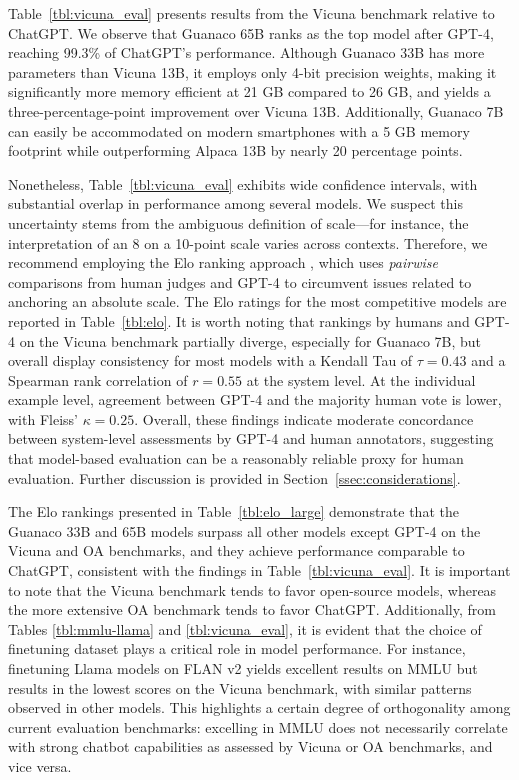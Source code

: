 Table~\ref{tbl:vicuna_eval} presents results from the Vicuna benchmark \cite{vicuna2023} relative to ChatGPT. We observe that {Guanaco} 65B ranks as the top model after GPT-4, reaching 99.3\% of ChatGPT's performance. Although {Guanaco} 33B has more parameters than Vicuna 13B, it employs only 4-bit precision weights, making it significantly more memory efficient at 21 GB compared to 26 GB, and yields a three-percentage-point improvement over Vicuna 13B. Additionally, {Guanaco} 7B can easily be accommodated on modern smartphones with a 5 GB memory footprint while outperforming Alpaca 13B by nearly 20 percentage points.

Nonetheless, Table~\ref{tbl:vicuna_eval} exhibits wide confidence intervals, with substantial overlap in performance among several models. We suspect this uncertainty stems from the ambiguous definition of scale—for instance, the interpretation of an 8 on a 10-point scale varies across contexts. Therefore, we recommend employing the Elo ranking approach \citep{elo1967proposed}, which uses \textit{pairwise} comparisons from human judges and GPT-4 to circumvent issues related to anchoring an absolute scale. The Elo ratings for the most competitive models are reported in Table~\ref{tbl:elo}. It is worth noting that rankings by humans and GPT-4 on the Vicuna benchmark partially diverge, especially for Guanaco 7B, but overall display consistency for most models with a Kendall Tau of $\tau=0.43$ and a Spearman rank correlation of $r=0.55$ at the system level. At the individual example level, agreement between GPT-4 and the majority human vote is lower, with Fleiss’ $\kappa=0.25$. Overall, these findings indicate moderate concordance between system-level assessments by GPT-4 and human annotators, suggesting that model-based evaluation can be a reasonably reliable proxy for human evaluation. Further discussion is provided in Section~\ref{ssec:considerations}.

The Elo rankings presented in Table~\ref{tbl:elo_large} demonstrate that the {Guanaco} 33B and 65B models surpass all other models except GPT-4 on the Vicuna and OA benchmarks, and they achieve performance comparable to ChatGPT, consistent with the findings in Table~\ref{tbl:vicuna_eval}. It is important to note that the Vicuna benchmark tends to favor open-source models, whereas the more extensive OA benchmark tends to favor ChatGPT. Additionally, from Tables \ref{tbl:mmlu-llama} and \ref{tbl:vicuna_eval}, it is evident that the choice of finetuning dataset plays a critical role in model performance. For instance, finetuning Llama models on FLAN v2 yields excellent results on MMLU but results in the lowest scores on the Vicuna benchmark, with similar patterns observed in other models. This highlights a certain degree of orthogonality among current evaluation benchmarks: excelling in MMLU does not necessarily correlate with strong chatbot capabilities as assessed by Vicuna or OA benchmarks, and vice versa.

